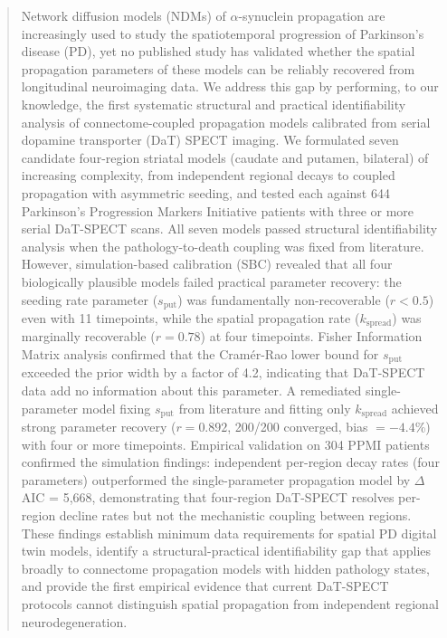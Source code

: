 \begin{abstract}
Network diffusion models (NDMs) of $\alpha$-synuclein propagation are increasingly used to study the spatiotemporal progression of Parkinson's disease (PD), yet no published study has validated whether the spatial propagation parameters of these models can be reliably recovered from longitudinal neuroimaging data. We address this gap by performing, to our knowledge, the first systematic structural and practical identifiability analysis of connectome-coupled propagation models calibrated from serial dopamine transporter (DaT) SPECT imaging. We formulated seven candidate four-region striatal models (caudate and putamen, bilateral) of increasing complexity, from independent regional decays to coupled propagation with asymmetric seeding, and tested each against 644 Parkinson's Progression Markers Initiative patients with three or more serial DaT-SPECT scans. All seven models passed structural identifiability analysis when the pathology-to-death coupling was fixed from literature. However, simulation-based calibration (SBC) revealed that all four biologically plausible models failed practical parameter recovery: the seeding rate parameter ($s_{\text{put}}$) was fundamentally non-recoverable ($r < 0.5$) even with 11 timepoints, while the spatial propagation rate ($k_{\text{spread}}$) was marginally recoverable ($r = 0.78$) at four timepoints. Fisher Information Matrix analysis confirmed that the Cram\'{e}r-Rao lower bound for $s_{\text{put}}$ exceeded the prior width by a factor of 4.2, indicating that DaT-SPECT data add no information about this parameter. A remediated single-parameter model fixing $s_{\text{put}}$ from literature and fitting only $k_{\text{spread}}$ achieved strong parameter recovery ($r = 0.892$, 200/200 converged, bias $= -4.4$\%) with four or more timepoints. Empirical validation on 304 PPMI patients confirmed the simulation findings: independent per-region decay rates (four parameters) outperformed the single-parameter propagation model by $\Delta$AIC = 5,668, demonstrating that four-region DaT-SPECT resolves per-region decline rates but not the mechanistic coupling between regions. These findings establish minimum data requirements for spatial PD digital twin models, identify a structural-practical identifiability gap that applies broadly to connectome propagation models with hidden pathology states, and provide the first empirical evidence that current DaT-SPECT protocols cannot distinguish spatial propagation from independent regional neurodegeneration.
\end{abstract}

